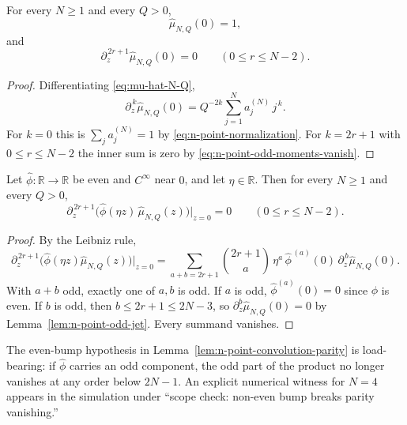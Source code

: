 \begin{lemma}
\label{lem:n-point-odd-jet}
For every \(N\ge 1\) and every \(Q>0\),
\begin{equation}
\label{eq:mu-hat-normalization}
        \widehat\mu_{N,Q}(0) = 1,
\end{equation}
and
\begin{equation}
\label{eq:mu-hat-odd-vanishing}
        \partial_z^{\,2r+1}\widehat\mu_{N,Q}(0) = 0
        \qquad (0 \le r \le N - 2).
\end{equation}
\end{lemma}

\begin{proof}
Differentiating \eqref{eq:mu-hat-N-Q},
\[
        \partial_z^{\,k}\widehat\mu_{N,Q}(0)
        = Q^{-2k}\sum_{j=1}^N a_j^{(N)}\, j^{\,k}.
\]
For \(k=0\) this is \(\sum_j a_j^{(N)} = 1\) by
\eqref{eq:n-point-normalization}.  For \(k=2r+1\) with \(0\le r\le N-2\)
the inner sum is zero by \eqref{eq:n-point-odd-moments-vanish}.
\end{proof}

\begin{lemma}
\label{lem:n-point-convolution-parity}
Let \(\widehat\phi:\mathbb R\to\mathbb R\) be even and \(C^\infty\) near
\(0\), and let \(\eta\in\mathbb R\).  Then for every \(N\ge 1\) and
every \(Q>0\),
\begin{equation}
\label{eq:n-point-convolution-vanishing}
        \partial_z^{\,2r+1}
        \bigl(\widehat\phi(\eta z)\,\widehat\mu_{N,Q}(z)\bigr)
        \big|_{z=0}
        = 0
        \qquad (0 \le r \le N - 2).
\end{equation}
\end{lemma}

\begin{proof}
By the Leibniz rule,
\[
        \partial_z^{\,2r+1}
        \bigl(\widehat\phi(\eta z)\widehat\mu_{N,Q}(z)\bigr)\big|_{z=0}
        = \sum_{a+b = 2r+1}\binom{2r+1}{a}\,
          \eta^a\,\widehat\phi^{\,(a)}(0)\,
          \partial_z^{\,b}\widehat\mu_{N,Q}(0).
\]
With \(a+b\) odd, exactly one of \(a, b\) is odd.  If \(a\) is odd,
\(\widehat\phi^{(a)}(0)=0\) since \(\widehat\phi\) is even.  If \(b\) is
odd, then \(b\le 2r+1\le 2N-3\), so
\(\partial_z^b\widehat\mu_{N,Q}(0)=0\) by
Lemma~\ref{lem:n-point-odd-jet}.  Every summand vanishes.
\end{proof}

\begin{remark}
\label{rem:n-point-even-bump-necessary}
The even-bump hypothesis in
Lemma~\ref{lem:n-point-convolution-parity} is load-bearing: if
\(\widehat\phi\) carries an odd component, the odd part of the product
no longer vanishes at any order below \(2N-1\).  An explicit numerical
witness for \(N=4\) appears in the simulation under
``scope check: non-even bump breaks parity vanishing.''
\end{remark}

